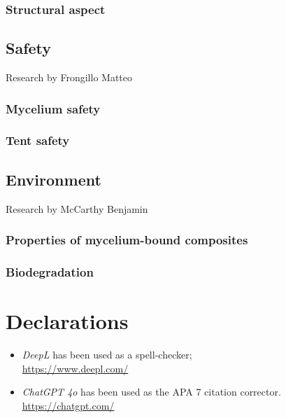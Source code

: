 \documentclass{article}
\begin{document}
\subsubsection{Structural aspect}

\subsection{Safety}
{\small Research by Frongillo Matteo}

\subsubsection{Mycelium safety}

\subsubsection{Tent safety}

\subsection{Environment}
{\small Research by McCarthy Benjamin}

\subsubsection{Properties of mycelium-bound composites}

\subsubsection{Biodegradation}

\newpage
\setlength{\bibitemsep}{1.2\baselineskip}
\printbibliography
\vfill

\section*{Declarations}
\begin{itemize}
    \item \textit{DeepL} has been used as a spell-checker;\\
        \url{https://www.deepl.com/}
    \item \textit{ChatGPT 4o} has been used as the APA 7 citation corrector.\\
        \url{https://chatgpt.com/}
\end{itemize}
\end{document}
